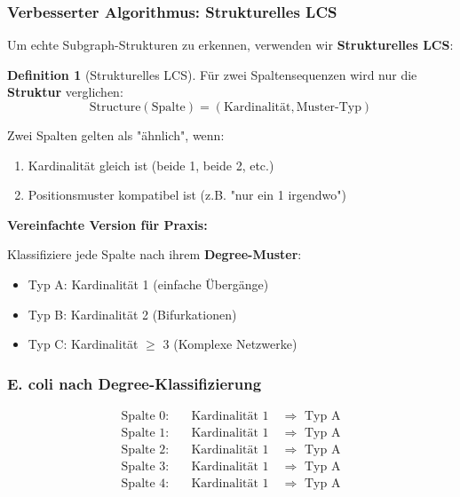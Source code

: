 \documentclass[a4paper,12pt]{article}
\theoremstyle{definition}
\newtheorem{definition}{Definition}
\begin{document}
\subsubsection{Verbesserter Algorithmus: Strukturelles LCS}

Um echte Subgraph-Strukturen zu erkennen, verwenden wir \textbf{Strukturelles LCS}:

\begin{definition}[Strukturelles LCS]
Für zwei Spaltensequenzen wird nur die \textbf{Struktur} verglichen:
\[
\text{Structure}(\text{Spalte}) = (\text{Kardinalität}, \text{Muster-Typ})
\]

Zwei Spalten gelten als "ähnlich", wenn:
\begin{enumerate}
    \item Kardinalität gleich ist (beide 1, beide 2, etc.)
    \item Positionsmuster kompatibel ist (z.B. "nur ein 1 irgendwo")
\end{enumerate}
\end{definition}

\textbf{Vereinfachte Version für Praxis:}

Klassifiziere jede Spalte nach ihrem \textbf{Degree-Muster}:
\begin{itemize}
    \item Typ A: Kardinalität 1 (einfache Übergänge)
    \item Typ B: Kardinalität 2 (Bifurkationen)
    \item Typ C: Kardinalität $\geq$ 3 (Komplexe Netzwerke)
\end{itemize}

\subsubsection*{E. coli nach Degree-Klassifizierung}

\begin{align*}
\text{Spalte 0:} &\quad \text{Kardinalität } 1 \quad \Rightarrow \text{ Typ A} \\
\text{Spalte 1:} &\quad \text{Kardinalität } 1 \quad \Rightarrow \text{ Typ A} \\
\text{Spalte 2:} &\quad \text{Kardinalität } 1 \quad \Rightarrow \text{ Typ A} \\
\text{Spalte 3:} &\quad \text{Kardinalität } 1 \quad \Rightarrow \text{ Typ A} \\
\text{Spalte 4:} &\quad \text{Kardinalität } 1 \quad \Rightarrow \text{ Typ A}
\end{align*}
\end{document}
